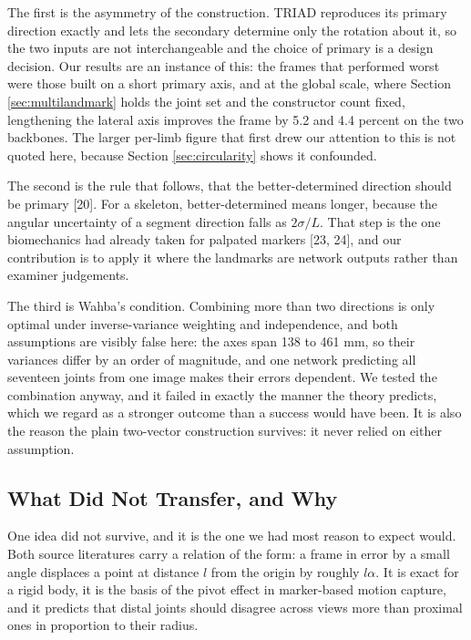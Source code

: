 \documentclass[12pt,a4paper]{report}
\begin{document}
The first is the asymmetry of the construction. TRIAD reproduces its primary direction exactly and lets the secondary determine only the rotation about it, so the two inputs are not interchangeable and the choice of primary is a design decision. Our results are an instance of this: the frames that performed worst were those built on a short primary axis, and at the global scale, where Section \ref{sec:multilandmark} holds the joint set and the constructor count fixed, lengthening the lateral axis improves the frame by 5.2 and 4.4 percent on the two backbones. The larger per-limb figure that first drew our attention to this is not quoted here, because Section \ref{sec:circularity} shows it confounded.

The second is the rule that follows, that the better-determined direction should be primary [20]. For a skeleton, better-determined means longer, because the angular uncertainty of a segment direction falls as $2\sigma/L$. That step is the one biomechanics had already taken for palpated markers [23, 24], and our contribution is to apply it where the landmarks are network outputs rather than examiner judgements.

The third is Wahba's condition. Combining more than two directions is only optimal under inverse-variance weighting and independence, and both assumptions are visibly false here: the axes span 138 to 461 mm, so their variances differ by an order of magnitude, and one network predicting all seventeen joints from one image makes their errors dependent. We tested the combination anyway, and it failed in exactly the manner the theory predicts, which we regard as a stronger outcome than a success would have been. It is also the reason the plain two-vector construction survives: it never relied on either assumption.

\subsection*{What Did Not Transfer, and Why}

One idea did not survive, and it is the one we had most reason to expect would. Both source literatures carry a relation of the form: a frame in error by a small angle displaces a point at distance $l$ from the origin by roughly $l\alpha$. It is exact for a rigid body, it is the basis of the pivot effect in marker-based motion capture, and it predicts that distal joints should disagree across views more than proximal ones in proportion to their radius.
\end{document}
